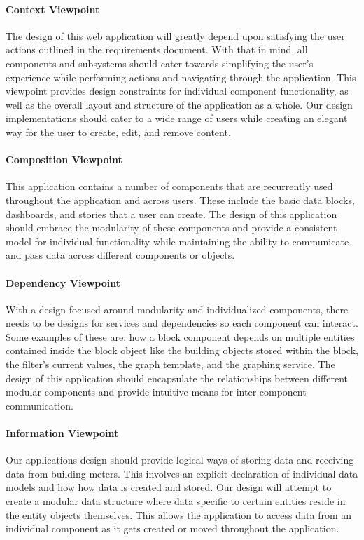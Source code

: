 \paragraph{Context Viewpoint}
The design of this web application will greatly depend upon satisfying the user actions outlined in the requirements document. With that in mind, all components and subsystems should cater towards simplifying the user's experience while performing actions and navigating through the application. This viewpoint provides design constraints for individual component functionality, as well as the overall layout and structure of the application as a whole. Our design implementations should cater to a wide range of users while creating an elegant way for the user to create, edit, and remove content.
\paragraph{Composition Viewpoint}
This application contains a number of components that are recurrently used throughout the application and across users. These include the basic data blocks, dashboards, and stories that a user can create. The design of this application should embrace the modularity of these components and provide a consistent model for individual functionality while maintaining the ability to communicate and pass data across different components or objects. 

\paragraph{Dependency Viewpoint}
With a design focused around modularity and individualized components, there needs to be designs for services and dependencies so each component can interact. Some examples of these are: how a block component depends on multiple entities contained inside the block object like the building objects stored within the block, the filter's current values, the graph template, and the graphing service. The design of this application should encapsulate the relationships between different modular components and provide intuitive means for inter-component communication.

\paragraph{Information Viewpoint}
Our applications design should provide logical ways of storing data and receiving data from building meters. This involves an explicit declaration of individual data models and how how data is created and stored. Our design will attempt to create a modular data structure where data specific to certain entities reside in the entity objects themselves. This allows the application to access data from an individual component as it gets created or moved throughout the application.


